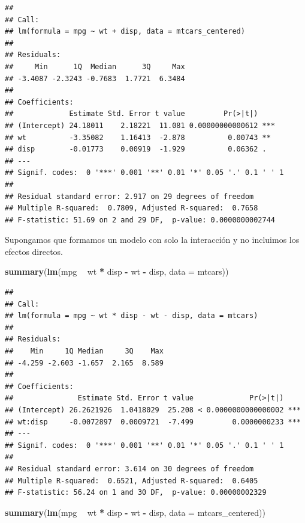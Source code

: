 \documentclass[
  12pt,
]{book}
\newenvironment{Shaded}{\begin{snugshade}}{\end{snugshade}}
\newcommand{\DataTypeTok}[1]{\textcolor[rgb]{0.13,0.29,0.53}{#1}}
\newcommand{\KeywordTok}[1]{\textcolor[rgb]{0.13,0.29,0.53}{\textbf{#1}}}
\newcommand{\NormalTok}[1]{#1}
\newcommand{\OperatorTok}[1]{\textcolor[rgb]{0.81,0.36,0.00}{\textbf{#1}}}
\newcommand{\StringTok}[1]{\textcolor[rgb]{0.31,0.60,0.02}{#1}}
\theoremstyle{definition}
\theoremstyle{definition}
\theoremstyle{definition}
\theoremstyle{remark}
\begin{document}
\begin{verbatim}
## 
## Call:
## lm(formula = mpg ~ wt + disp, data = mtcars_centered)
## 
## Residuals:
##     Min      1Q  Median      3Q     Max 
## -3.4087 -2.3243 -0.7683  1.7721  6.3484 
## 
## Coefficients:
##             Estimate Std. Error t value         Pr(>|t|)    
## (Intercept) 24.18011    2.18221  11.081 0.00000000000612 ***
## wt          -3.35082    1.16413  -2.878          0.00743 ** 
## disp        -0.01773    0.00919  -1.929          0.06362 .  
## ---
## Signif. codes:  0 '***' 0.001 '**' 0.01 '*' 0.05 '.' 0.1 ' ' 1
## 
## Residual standard error: 2.917 on 29 degrees of freedom
## Multiple R-squared:  0.7809, Adjusted R-squared:  0.7658 
## F-statistic: 51.69 on 2 and 29 DF,  p-value: 0.0000000002744
\end{verbatim}

Supongamos que formamos un modelo con solo la interacción y no incluimos los efectos directos.

\begin{Shaded}
\begin{Highlighting}[]
\KeywordTok{summary}\NormalTok{(}\KeywordTok{lm}\NormalTok{(mpg }\OperatorTok{~}\StringTok{ }\NormalTok{wt }\OperatorTok{*}\StringTok{ }\NormalTok{disp }\OperatorTok{-}\StringTok{ }\NormalTok{wt }\OperatorTok{-}\StringTok{ }\NormalTok{disp, }\DataTypeTok{data =}\NormalTok{ mtcars))}
\end{Highlighting}
\end{Shaded}

\begin{verbatim}
## 
## Call:
## lm(formula = mpg ~ wt * disp - wt - disp, data = mtcars)
## 
## Residuals:
##    Min     1Q Median     3Q    Max 
## -4.259 -2.603 -1.657  2.165  8.589 
## 
## Coefficients:
##               Estimate Std. Error t value             Pr(>|t|)    
## (Intercept) 26.2621926  1.0418029  25.208 < 0.0000000000000002 ***
## wt:disp     -0.0072897  0.0009721  -7.499         0.0000000233 ***
## ---
## Signif. codes:  0 '***' 0.001 '**' 0.01 '*' 0.05 '.' 0.1 ' ' 1
## 
## Residual standard error: 3.614 on 30 degrees of freedom
## Multiple R-squared:  0.6521, Adjusted R-squared:  0.6405 
## F-statistic: 56.24 on 1 and 30 DF,  p-value: 0.00000002329
\end{verbatim}

\begin{Shaded}
\begin{Highlighting}[]
\KeywordTok{summary}\NormalTok{(}\KeywordTok{lm}\NormalTok{(mpg }\OperatorTok{~}\StringTok{ }\NormalTok{wt }\OperatorTok{*}\StringTok{ }\NormalTok{disp }\OperatorTok{-}\StringTok{ }\NormalTok{wt }\OperatorTok{-}\StringTok{ }\NormalTok{disp, }\DataTypeTok{data =}\NormalTok{ mtcars_centered))}
\end{Highlighting}
\end{Shaded}
\end{document}

